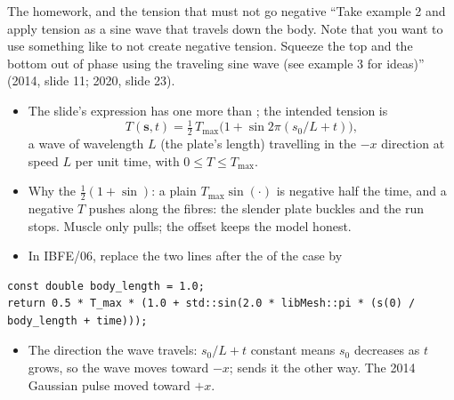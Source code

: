 \documentclass[aspectratio=169,11pt]{beamer}
\begin{document}
\begin{frame}[fragile]{The homework, and the tension that must not go negative}
\label{fr:homework}
\footnotesize
``Take example 2 and apply tension as a sine wave that travels down the body. Note that you want to use something like  to not create negative tension. Squeeze the top and the bottom out of phase using the traveling sine wave (see example 3 for ideas)'' (2014, slide 11; 2020, slide 23).
\begin{itemize}
  \item The slide's expression has one more \code{(} than \code{)}; the intended tension is
  \[ T(\mathbf{s}, t) = \tfrac12\,T_{\max}\bigl(1 + \sin 2\pi(s_0/L + t)\bigr), \]
  a wave of wavelength $L$ (the plate's length) travelling in the $-x$ direction at speed $L$ per unit time, with $0 \le T \le T_{\max}$.
  \item Why the $\tfrac12(1 + \sin)$: a plain $T_{\max}\sin(\cdot)$ is negative half the time, and a negative $T$ pushes along the fibres: the slender plate buckles and the run stops. Muscle only pulls; the offset keeps the model honest.
  \item In IBFE/06, replace the two lines after the  of the  case by
\end{itemize}
\begin{lstlisting}[style=cpptiny]
const double body_length = 1.0;
return 0.5 * T_max * (1.0 + std::sin(2.0 * libMesh::pi * (s(0) / body_length + time)));
\end{lstlisting}
\begin{itemize}
  \item The direction the wave travels: $s_0/L + t$ constant means $s_0$ decreases as $t$ grows, so the wave moves toward $-x$;  sends it the other way. The 2014 Gaussian pulse moved toward $+x$.
\end{itemize}
\end{frame}
\end{document}
